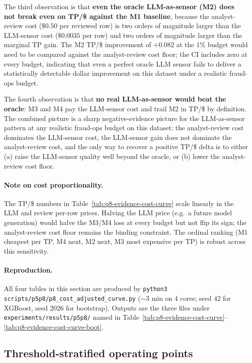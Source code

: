 \documentclass{article}
\providecommand{\tableref}[1]{Table~\ref{#1}}
\begin{document}
The third observation is that \textbf{even the oracle LLM-as-sensor
(M2) does not break even on TP/\$ against the M1 baseline}, because
the analyst-review cost ($\$0.50$ per reviewed row) is two orders of
magnitude larger than the LLM-sensor cost ($\$0.0035$ per row) and
two orders of magnitude larger than the marginal TP gain. The M2 TP/\$
improvement of $+0.082$ at the $1\%$ budget would need to be compared
against the analyst-review cost floor; the CI includes zero at every
budget, indicating that even a perfect oracle LLM sensor fails to
deliver a statistically detectable dollar improvement on this dataset
under a realistic fraud-ops budget.

The fourth observation is that \textbf{no real LLM-as-sensor would beat
the oracle}: M3 and M4 pay the LLM-sensor cost and trail M2 in TP/\$
by definition. The combined picture is a sharp negative-evidence
picture for the LLM-as-sensor pattern at any realistic fraud-ops
budget on this dataset: the analyst-review cost dominates the
LLM-sensor cost, the LLM-sensor gain does not dominate the
analyst-review cost, and the only way to recover a positive TP/\$
delta is to either (a) raise the LLM-sensor quality well beyond the
oracle, or (b) lower the analyst-review cost floor.

\paragraph{Note on cost proportionality.} The TP/\$ numbers in
\tableref{tab:p8-evidence-cost-curve} scale linearly in the LLM and
review per-row prices. Halving the LLM price (e.g.\ a future model
generation) would halve the M3/M4 loss at every budget but not flip
its sign; the analyst-review cost floor remains the binding
constraint. The ordinal ranking (M1 cheapest per TP, M4 next, M2 next,
M3 most expensive per TP) is robust across this sensitivity.

\paragraph{Reproduction.} All four tables in this section are produced
by \texttt{python3 scripts/p5p8/p8\_cost\_adjusted\_curve.py}
($\sim$3 min on 4 cores; seed $42$ for XGBoost, seed $2026$ for
bootstrap). Outputs are the three files under
\texttt{experiments/results/p5p8/} named in
\tableref{tab:p8-evidence-cost-curve}--\ref{tab:p8-evidence-cost-curve-boot}.

\subsection{Threshold-stratified operating points}
\label{sec:p8-evidence-threshold}
\end{document}
